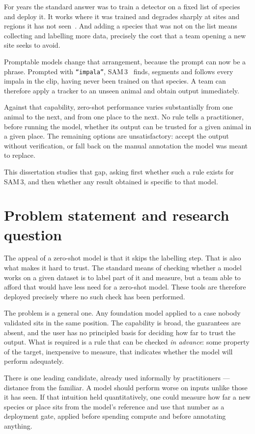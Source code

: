 For years the standard answer was to train a detector on a fixed list of species and deploy it. It works
where it was trained and degrades sharply at sites and regions it has not seen~\cite{terra,wilds}. And adding
a species that was not on the list means collecting and labelling more data, precisely the cost that a team
opening a new site seeks to avoid.

Promptable models change that arrangement, because the prompt can now be a phrase. Prompted with
\texttt{``impala''}, SAM\,3~\cite{sam3} finds, segments and follows every impala in the clip, having never
been trained on that species. A team can therefore apply a tracker to an unseen animal and obtain output
immediately.

Against that capability, zero-shot performance varies substantially from one animal to the next, and from
one place to the next. No rule tells a practitioner, before running the model, whether its output can be
trusted for a given animal in a given place. The remaining options are unsatisfactory: accept the output
without verification, or fall back on the manual annotation the model was meant to replace.

This dissertation studies that gap, asking first whether such a rule exists for SAM\,3, and then whether any
result obtained is specific to that model.

\section{Problem statement and research question}
\label{sec:problem}
The appeal of a zero-shot model is that it skips the labelling step. That is also what makes it hard to trust.
The standard means of checking whether a model works on a given dataset is to label part of it and measure,
but a team able to afford that would have less need for a zero-shot model. These tools are therefore
deployed precisely where no such check has been performed.

The problem is a general one. Any foundation model applied to a case nobody validated sits in the same
position. The capability is broad, the guarantees are absent, and the user has no principled basis for
deciding how far to trust the output. What is required is a rule that can be checked \emph{in advance}: some
property of the target, inexpensive to measure, that indicates whether the model will perform adequately.

There is one leading candidate, already used informally by practitioners --- distance from the familiar. A
model should perform worse on inputs unlike those it has seen. If that intuition held quantitatively,
one could measure how far a new species or place sits from the model's reference and use that number as a
deployment gate, applied before spending compute and before annotating anything.

